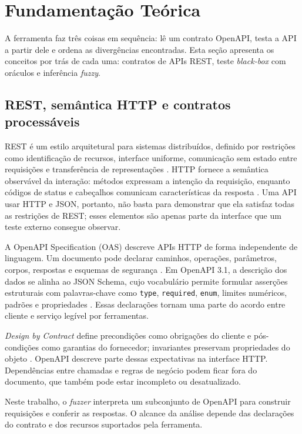 \section{Fundamentação Teórica}\label{sec:fundamentacao}

A ferramenta faz três coisas em sequência: lê um contrato OpenAPI, testa a API
a partir dele e ordena as divergências encontradas. Esta seção apresenta os
conceitos por trás de cada uma: contratos de APIs REST, teste
\textit{black-box} com oráculos e inferência \textit{fuzzy}.

\subsection{REST, semântica HTTP e contratos processáveis}

REST é um estilo arquitetural para sistemas distribuídos, definido por
restrições como identificação de recursos, interface uniforme, comunicação
sem estado entre requisições e transferência de representações
\cite{fielding2000rest}. HTTP fornece a semântica observável da interação:
métodos expressam a intenção da requisição, enquanto códigos de status e
cabeçalhos comunicam características da resposta \cite{rfc9110}. Uma API usar
HTTP e JSON, portanto, não basta para demonstrar que ela satisfaz todas as
restrições de REST; esses elementos são apenas parte da interface que um teste
externo consegue observar.

A OpenAPI Specification (OAS) descreve APIs HTTP de forma independente de
linguagem. Um documento pode declarar caminhos, operações, parâmetros, corpos,
respostas e esquemas de segurança \cite{openapi310}. Em OpenAPI 3.1, a
descrição dos dados se alinha ao JSON Schema, cujo vocabulário permite formular
asserções estruturais com palavras-chave como \texttt{type},
\texttt{required}, \texttt{enum}, limites numéricos, padrões e propriedades
\cite{jsonschema202012}. Essas declarações tornam uma parte do acordo entre
cliente e serviço legível por ferramentas.

\textit{Design by Contract} define precondições como obrigações do cliente e
pós-condições como garantias do fornecedor; invariantes preservam propriedades
do objeto \cite{meyer1992designbycontract}. OpenAPI descreve parte dessas
expectativas na interface HTTP. Dependências entre chamadas e regras de negócio
podem ficar fora do documento, que também pode estar incompleto ou desatualizado.

Neste trabalho, o \textit{fuzzer} interpreta um subconjunto de OpenAPI para
construir requisições e conferir as respostas. O alcance da análise depende
das declarações do contrato e dos recursos suportados pela ferramenta.


